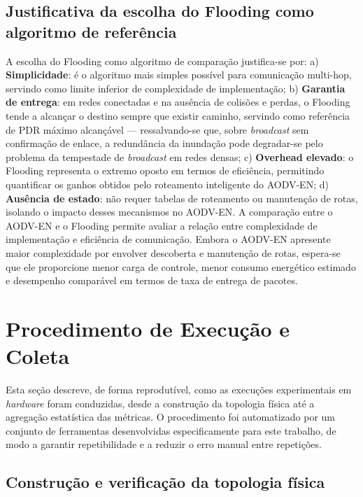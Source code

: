 \subsection{Justificativa da escolha do Flooding como algoritmo de
referência}\label{justificativa-da-escolha-do-flooding-como-algoritmo-de-referuxeancia}

A escolha do Flooding como algoritmo de comparação justifica-se por: a)
\textbf{Simplicidade}: é o algoritmo mais simples possível para
comunicação multi-hop, servindo como limite inferior de complexidade de
implementação; b) \textbf{Garantia de entrega}: em redes conectadas e na ausência de
colisões e perdas, o Flooding tende a alcançar o destino sempre que
existir caminho, servindo como referência de PDR máximo alcançável ---
ressalvando-se que, sobre \emph{broadcast} sem confirmação de enlace, a
redundância da inundação pode degradar-se pelo problema da tempestade de
\emph{broadcast} em redes densas; c) \textbf{Overhead
elevado}: o Flooding representa o extremo oposto em termos de
eficiência, permitindo quantificar os ganhos obtidos pelo roteamento
inteligente do AODV-EN; d) \textbf{Ausência de estado}: não requer
tabelas de roteamento ou manutenção de rotas, isolando o impacto desses
mecanismos no AODV-EN. A comparação entre o AODV-EN e o Flooding
permite avaliar a relação entre complexidade de implementação e
eficiência de comunicação. Embora o AODV-EN apresente maior complexidade
por envolver descoberta e manutenção de rotas, espera-se que ele
proporcione menor carga de controle, menor consumo energético estimado e
desempenho comparável em termos de taxa de entrega de pacotes.

\section{Procedimento de Execução e Coleta}\label{procedimento-de-execucao-e-coleta}

Esta seção descreve, de forma reprodutível, como as execuções
experimentais em \emph{hardware} foram conduzidas, desde a construção da
topologia física até a agregação estatística das métricas. O
procedimento foi automatizado por um conjunto de ferramentas
desenvolvidas especificamente para este trabalho, de modo a garantir
repetibilidade e a reduzir o erro manual entre repetições.

\subsection{Construção e verificação da topologia física}\label{construcao-topologia}

